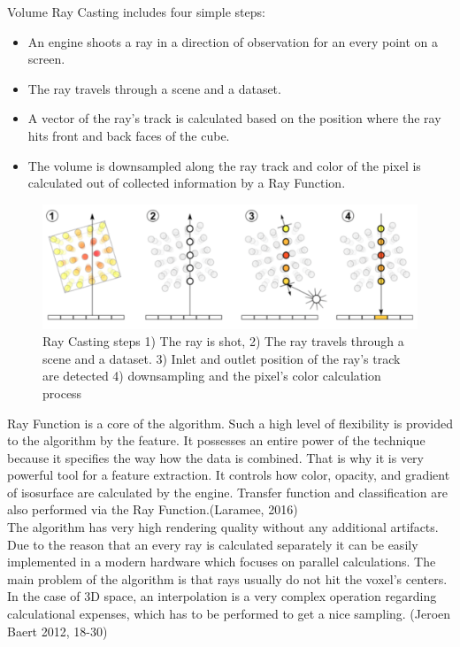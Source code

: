 \documentclass[twoside, english, 11pt]{report}
\begin{document}
Volume Ray Casting includes four simple steps:
\begin{itemize} \item An engine shoots a ray in a direction of observation for an every point on a screen.
\item The ray travels through a scene and a dataset.
\item A vector of the ray's track is calculated based on the position where the ray hits front and back faces of the cube.
\item The volume is downsampled along the ray track and color of the pixel is calculated out of collected information by a Ray Function.
\end{itemize}
\begin{figure}[!h]
\centerline{\includegraphics[scale=0.35]{img/rayCast}}
\caption{Ray Casting steps 1) The ray is shot, 2) The ray travels through a scene and a dataset. 3) Inlet and outlet position of the ray's track are detected 4) downsampling and the pixel's color calculation process}
\end{figure}

Ray Function is a core of the algorithm. Such a high level of flexibility is provided to the algorithm by the feature. It possesses an entire power of the technique because it specifies the way how the data is combined. That is why it is very powerful tool for a feature extraction. It controls how color, opacity, and gradient of isosurface are calculated by the engine. Transfer function and classification are also performed via the Ray Function.(Laramee, 2016)\\

The algorithm has very high rendering quality without any additional artifacts. Due to the reason that an every ray is calculated separately it can be easily implemented in a modern hardware which focuses on parallel calculations. The main problem of the algorithm is that rays usually do not hit the voxel's centers. In the case of 3D space, an interpolation is a very complex operation regarding calculational expenses, which has to be performed to get a nice sampling. (Jeroen Baert 2012, 18-30)
\end{document}
